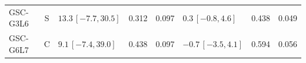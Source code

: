 \begin{longtable}{lcp{37mm}rrp{37mm}rr}
GSC-G3L6 & S & \(13.3\,[-7.7,30.5]\) & 0.312 & 0.097 & \(0.3\,[-0.8,4.6]\) & 0.438 & 0.049\\
GSC-G6L7 & C & \(9.1\,[-7.4,39.0]\) & 0.438 & 0.097 & \(-0.7\,[-3.5,4.1]\) & 0.594 & 0.056\\

\end{longtable}
